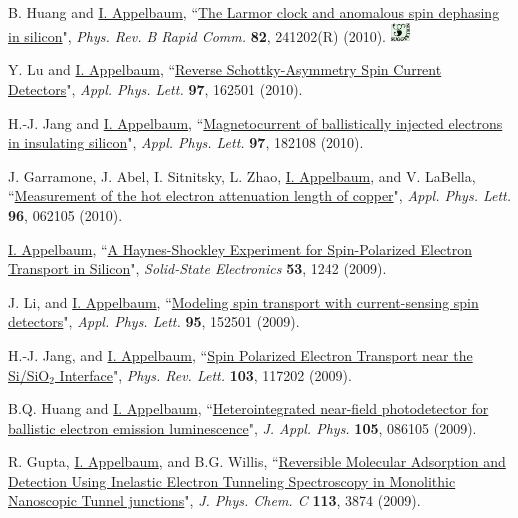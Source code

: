 \documentclass[paper=letter,fontsize=11pt]{scrartcl} %
\newcommand{\PaperEntry}[7]{
		\noindent #1, ``\href{#7}{#2}", \textit{#3} \textbf{#4}, #5 (#6).}
\begin{document}
\begin{etaremune}
\item\PaperEntry{B. Huang and \underline{I. Appelbaum}}{The Larmor clock and anomalous spin dephasing in silicon}{Phys. Rev. B Rapid Comm.}{82}{241202(R)}{2010}{http://dx.doi.org/10.1103/PhysRevB.82.241202} \includegraphics[width=0.2in]{sug.pdf} 

\item\PaperEntry{Y. Lu and \underline{I. Appelbaum}}{Reverse Schottky-Asymmetry Spin Current Detectors}{Appl. Phys. Lett.}{97}{162501}{2010}{http://dx.doi.org/10.1063/1.3504659}

\item\PaperEntry{H.-J. Jang and \underline{I. Appelbaum}}{Magnetocurrent of ballistically injected electrons in insulating silicon}{Appl. Phys. Lett.}{97}{182108}{2010}{http://dx.doi.org/10.1063/1.3511681}

\item\PaperEntry{J. Garramone, J. Abel, I. Sitnitsky, L. Zhao, \underline{I. Appelbaum}, and V. LaBella}{Measurement of the hot electron attenuation length of copper}{Appl. Phys. Lett.}{96}{062105}{2010}{http://dx.doi.org/10.1063/1.3299712}

\item\PaperEntry{\underline{I. Appelbaum}}{A Haynes-Shockley Experiment for Spin-Polarized Electron Transport in Silicon}{Solid-State Electronics}{53}{1242}{2009}{http://dx.doi.org/10.1016/j.sse.2009.09.012}

\item\PaperEntry{J. Li, and \underline{I. Appelbaum}}{Modeling spin transport with current-sensing spin detectors}{Appl. Phys. Lett.}{95}{152501}{2009}{http://dx.doi.org/10.1063/1.3241080}

\item\PaperEntry{H.-J. Jang, and \underline{I. Appelbaum}}{Spin Polarized Electron Transport near the Si/SiO$_2$ Interface}{Phys. Rev. Lett.}{103}{117202}{2009}{http://dx.doi.org/10.1103/PhysRevLett.103.117202}

\item\PaperEntry{B.Q. Huang and \underline{I. Appelbaum}}{Heterointegrated near-field photodetector for ballistic electron emission luminescence}{J. Appl. Phys.}{105}{086105}{2009}{http://dx.doi.org/10.1063/1.3116507}

\item\PaperEntry{R. Gupta, \underline{I. Appelbaum}, and B.G. Willis}{Reversible Molecular Adsorption and Detection Using Inelastic Electron Tunneling Spectroscopy in Monolithic Nanoscopic Tunnel junctions}{J. Phys. Chem. C}{113}{3874}{2009}{http://dx.doi.org/10.1021/jp806074f}


\end{etaremune}
\end{document}
